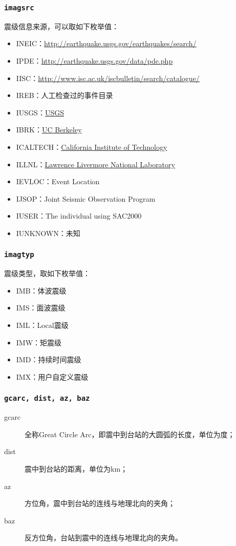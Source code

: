 \subsubsection{\texttt{imagsrc}}
震级信息来源，可以取如下枚举值：
\begin{itemize}
\ttfamily
\item INEIC：\url{http://earthquake.usgs.gov/earthquakes/search/}
\item IPDE：\url{http://earthquake.usgs.gov/data/pde.php}
\item IISC：\url{http://www.isc.ac.uk/iscbulletin/search/catalogue/}
\item IREB：人工检查过的事件目录
\item IUSGS：\href{http://earthquake.usgs.gov}{USGS}
\item IBRK：\href{http://seismo.berkeley.edu/}{UC Berkeley}
\item ICALTECH：\href{http://www.seismolab.caltech.edu}{California Institute of Technology}
\item ILLNL：\href{https://www.llnl.gov/}{Lawrence Livermore National Laboratory}
\item IEVLOC：Event Location
\item IJSOP：Joint Seismic Observation Program
\item IUSER：The individual using SAC2000
\item IUNKNOWN：未知
\end{itemize}

\subsubsection{\texttt{imagtyp}}
震级类型，取如下枚举值：
\begin{itemize}
\ttfamily
\item IMB：体波震级
\item IMS：面波震级
\item IML：Local震级
\item IMW：矩震级
\item IMD：持续时间震级
\item IMX：用户自定义震级
\end{itemize}

\subsubsection{\texttt{gcarc, dist, az, baz}}
\begin{description}
\item [gcarc] 全称Great Circle Arc，即震中到台站的大圆弧的长度，单位为度；
\item [dist] 震中到台站的距离，单位为km；
\item [az] 方位角，震中到台站的连线与地理北向的夹角；
\item [baz] 反方位角，台站到震中的连线与地理北向的夹角。
\end{description}


